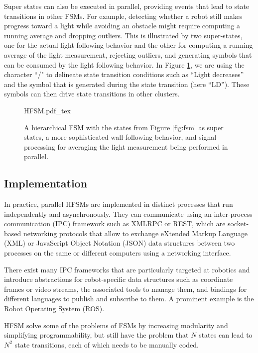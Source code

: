 Super states can also be executed in parallel, providing events that lead to state transitions in other FSMs. For example, detecting whether a robot still makes progress toward a light while avoiding an obstacle might require computing a running average and dropping outliers. This is illustrated by two super-states, one for the actual light-following behavior and the other for computing a running average of the light measurement, rejecting outliers, and generating symbols that can be consumed by the light following behavior. In Figure \ref{fig:hfsm}, we are using the character ``/" to delineate state transition conditions such as ``Light decreases'' and the symbol that is generated during the state transition (here ``LD''). These symbols can then drive state transitions in other clusters.

\begin{figure}
\centering
    \tiny
    \def\svgwidth{1.0\textwidth}
    {HFSM.pdf_tex}
\caption{A hierarchical FSM with the states from Figure \ref{fig:fsm} as super states, a more sophisticated wall-following behavior, and signal processing for averaging the light measurement being performed in parallel. \label{fig:hfsm}}
\end{figure}

\subsection{Implementation}
In practice, parallel HFSMs are implemented in distinct processes that run independently and asynchronously. They can communicate using an inter-process communication (IPC) framework  such as XMLRPC or REST, which are socket-based networking protocols that allow to exchange eXtended Markup Language (XML) or JavaScript Object Notation (JSON) data structures between two processes on the same or different computers using a networking interface.

There exist many IPC frameworks that are particularly targeted at robotics and introduce abstractions for robot-specific data structures such as coordinate frames or video streams, the associated tools to manage them, and bindings for different languages to publish and subscribe to them. A prominent example is the Robot Operating System (ROS).


HFSM solve some of the problems of FSMs by increasing modularity and simplifying programmability, but still have the problem that $N$ states can lead to $N^2$ state transitions, each of which needs to be manually coded.

